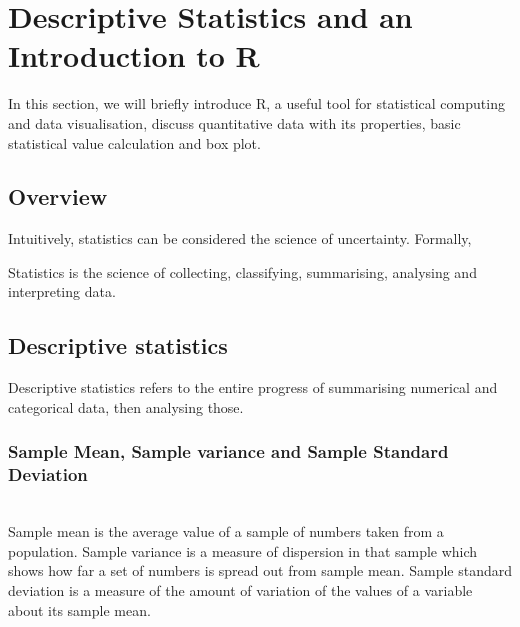 \chapter{Descriptive Statistics and an Introduction to R}
\label{sec.matrix}
\pagestyle{myheadings}  

In this section, we will briefly introduce R, a useful tool for statistical computing and data visualisation, discuss quantitative data with its properties, basic statistical value calculation and box plot.\\

\section{Overview}


Intuitively, statistics can be considered the science of uncertainty. Formally,

\begin{definition}[Statistics]	
Statistics is the science of collecting, classifying, summarising, analysing and interpreting data.
\end{definition}

\section{Descriptive statistics}

Descriptive statistics refers to the entire progress of summarising numerical and categorical data, then analysing those.\\ 

\noindent
\subsection{Sample Mean, Sample variance and Sample Standard Deviation}\\

\noindent
Sample mean is the average value of a sample of numbers taken from a population. Sample variance is a measure of dispersion in that sample which shows how far a set of numbers is spread out from sample mean. Sample standard deviation is a measure of the amount of variation of the values of a variable about its sample mean.

